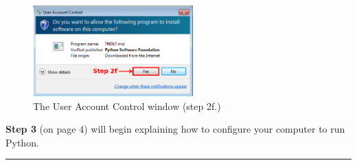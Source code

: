 \documentclass[11pt,english]{article}
\newcommand{\myhrule}{\vspace{0.3cm}\hrule\vspace{0.3cm}}
\begin{document}
\begin{figure}[h]
\begin{center}
\includegraphics[width=0.55\textwidth]{dia11}
\end{center}
\caption{The User Account Control window (step 2f.)}
\label{fig:dia11}
\end{figure}
\vfill
{\bf Step 3} (on page 4) will begin explaining how to configure your computer
to run Python.
\myhrule
\end{document}
